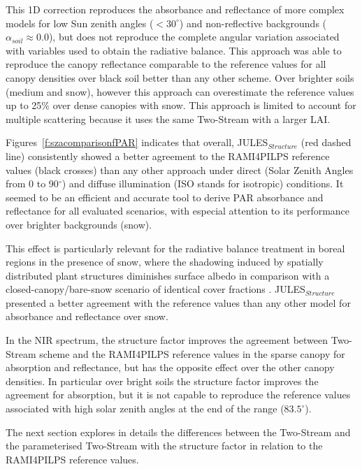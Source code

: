 \documentclass[a4paper,11pt]{report}
\begin{document}
This 1D correction reproduces the absorbance and reflectance of more complex models for low Sun zenith angles ($< 30^{\circ}$) and non-reflective backgrounds ($\alpha_{soil} \approx 0.0$), but does not reproduce the complete angular variation associated with variables used to obtain the radiative balance. This approach was able to reproduce the canopy reflectance comparable to the reference values for all canopy densities over black soil better than any other scheme. Over brighter soils (medium and snow), however this approach can overestimate the reference values up to 25\% over dense canopies with snow. This approach is limited to account for multiple scattering because it uses the same Two-Stream with a larger LAI.  

Figures~\ref{f:szacomparisonfPAR} indicates that overall, JULES$_{Structure}$ (red dashed line) consistently showed a better agreement to the RAMI4PILPS reference values (black crosses) than any other approach under direct (Solar Zenith Angles from 0 to 90$^{\circ}$) and diffuse illumination (ISO stands for isotropic) conditions. It seemed to be an efficient and accurate tool to derive PAR absorbance and reflectance for all evaluated scenarios, with especial attention to its performance over brighter backgrounds (snow). 

This effect is particularly relevant for the radiative balance treatment in boreal regions in the presence of snow, where the shadowing induced by spatially distributed plant structures diminishes surface albedo in comparison with a closed-canopy/bare-snow scenario of identical cover fractions \citep{Viterbo1999}. JULES$_{Structure}$ presented a better agreement with the reference values than any other model for absorbance and reflectance over snow. 

In the NIR spectrum, the structure factor improves the agreement between Two-Stream scheme and the RAMI4PILPS reference values in the sparse canopy for absorption and reflectance, but has the opposite effect over the other canopy densities. In particular over bright soils the structure factor improves the agreement for absorption, but it is not capable to reproduce the reference values associated with high solar zenith angles at the end of the range ($83.5^{\circ}$).

The next section explores in details the differences between the Two-Stream and the parameterised Two-Stream with the structure factor in relation to the RAMI4PILPS reference values.
\end{document}
